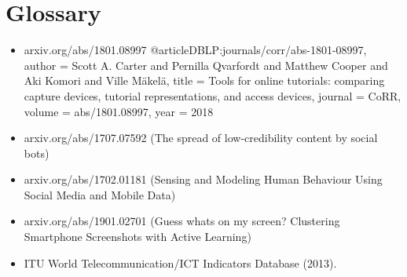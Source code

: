 \documentclass[12pt, times new roman]{article}
\begin{document}
\section{Glossary}
\begin{itemize}
	\item arxiv.org/abs/1801.08997 
@article{DBLP:journals/corr/abs-1801-08997,
author    = {Scott A. Carter and
               Pernilla Qvarfordt and
               Matthew Cooper and
               Aki Komori and
               Ville M{\"{a}}kel{\"{a}}},
title     = {Tools for online tutorials: comparing capture devices, tutorial representations,
               and access devices},
journal   = {CoRR},
volume    = {abs/1801.08997},
year      = {2018}
}
	\item arxiv.org/abs/1707.07592 (The spread of low-credibility content by social bots) 								  $$$$
	\item arxiv.org/abs/1702.01181 (Sensing and Modeling Human Behaviour Using Social Media and Mobile Data) 				  $$$$
	\item arxiv.org/abs/1901.02701 (Guess whats on my screen? Clustering Smartphone Screenshots with Active Learning) 			  $$$$
	\item ITU World Telecommunication/ICT Indicators Database (2013).
\end{itemize}
\end{document}
